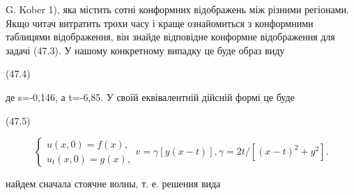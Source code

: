 \documentclass[
  ukrainian,
]{article}
\begin{document}
G. Kober 1), яка містить сотні конформних відображень між різними
регіонами. Якщо читач витратить трохи часу і краще ознайомиться з
конформними таблицями відображення, він знайде відповідне конформне
відображення для задачі (47.3). У нашому конкретному випадку це буде
образ виду

(47.4)

де s=-0,146, а t=-6,85. У своїй еквівалентній дійсній формі це буде

(47.5)

\[
\begin{cases} u(x, 0) = f(x), \\ u_t(x, 0) = g(x), \end{cases}
v = \gamma [y(x-t)],
\gamma = 2t/[(x-t)^2 + y^2].
\]

найдем сначала стоячне волны, т. е. решения вида
\end{document}
